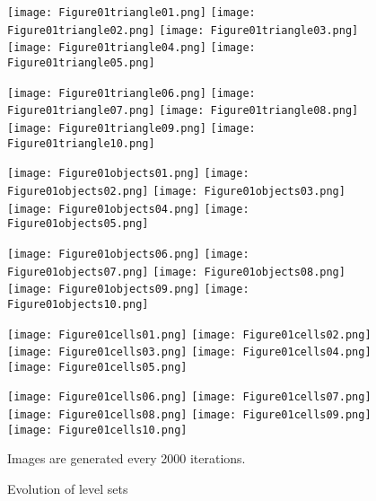 \documentclass[english, nochinese]{pnote}
\begin{document}
\begin{figure}[htbp]
{
\centering

\texttt{[image: Figure01triangle01.png]}
\texttt{[image: Figure01triangle02.png]}
\texttt{[image: Figure01triangle03.png]}
\texttt{[image: Figure01triangle04.png]}
\texttt{[image: Figure01triangle05.png]}

\texttt{[image: Figure01triangle06.png]}
\texttt{[image: Figure01triangle07.png]}
\texttt{[image: Figure01triangle08.png]}
\texttt{[image: Figure01triangle09.png]}
\texttt{[image: Figure01triangle10.png]}

\texttt{[image: Figure01objects01.png]}
\texttt{[image: Figure01objects02.png]}
\texttt{[image: Figure01objects03.png]}
\texttt{[image: Figure01objects04.png]}
\texttt{[image: Figure01objects05.png]}

\texttt{[image: Figure01objects06.png]}
\texttt{[image: Figure01objects07.png]}
\texttt{[image: Figure01objects08.png]}
\texttt{[image: Figure01objects09.png]}
\texttt{[image: Figure01objects10.png]}

\texttt{[image: Figure01cells01.png]}
\texttt{[image: Figure01cells02.png]}
\texttt{[image: Figure01cells03.png]}
\texttt{[image: Figure01cells04.png]}
\texttt{[image: Figure01cells05.png]}

\texttt{[image: Figure01cells06.png]}
\texttt{[image: Figure01cells07.png]}
\texttt{[image: Figure01cells08.png]}
\texttt{[image: Figure01cells09.png]}
\texttt{[image: Figure01cells10.png]}

\caption{Evolution of level sets}
\label{Fig:Evo}
}
{
\footnotesize Images are generated every 2000 iterations.
}
\end{figure}
\end{document}

